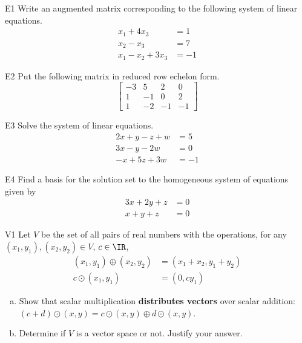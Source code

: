 \documentclass{sbgLAexam}
\begin{document}
\begin{problem}{E1}
Write an augmented matrix corresponding to the following system of linear equations.
\begin{align*}
x_1+4x_3 &= 1 \\
x_2-x_3 &= 7 \\
x_1-x_2+3x_3 &= -1
\end{align*}
\end{problem}

\begin{problem}{E2}
Put the following matrix in reduced row echelon form.
$$\begin{bmatrix}-3 & 5 & 2 & 0 \\ 1 & -1 & 0 & 2 \\ 1 & -2 & -1 & -1 \end{bmatrix}$$
\end{problem}

\begin{problem}{E3}
Solve the system of linear equations.
\begin{align*}
2x+y-z+w &=5 \\
3x-y-2w &= 0 \\
-x+5z+3w&=-1
\end{align*}
\end{problem}

\begin{problem}{E4}
Find a basis for the solution set to the homogeneous system of equations
given by
\begin{align*}
3x+2y+z &= 0 \\
x+y+z &= 0
\end{align*}
\end{problem}

\begin{problem}{V1}
Let $V$ be the set of all pairs of real numbers with the operations, for any $(x_1,y_1), (x_2,y_2) \in V$, $c \in \IR$,
\begin{align*}
(x_1,y_1) \oplus (x_2,y_2) &= (x_1+x_2,y_1+y_2) \\
c \odot (x_1,y_1) &= (0, cy_1)
\end{align*}
\begin{enumerate}[(a)]
\item Show that scalar multiplication
      \textbf{distributes vectors} over scalar addition:
      \((c+d)\odot(x,y)=
      c\odot(x,y) \oplus d\odot(x,y)\).
\item Determine if $V$ is a vector space or not.  Justify your answer.
\end{enumerate}
\end{problem}
\end{document}
